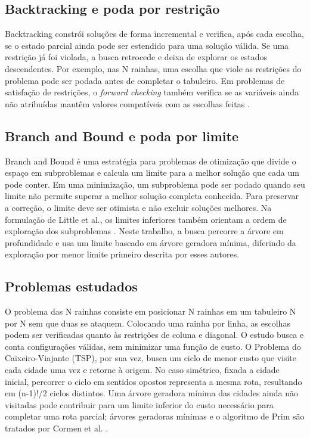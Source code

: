 \documentclass[12pt]{article}
\begin{document}
\subsection{Backtracking e poda por restrição}

Backtracking constrói soluções de forma incremental e verifica, após cada escolha, se o estado parcial ainda pode ser estendido para uma solução válida. Se uma restrição já foi violada, a busca retrocede e deixa de explorar os estados descendentes. Por exemplo, nas N rainhas, uma escolha que viole as restrições do problema pode ser podada antes de completar o tabuleiro. Em problemas de satisfação de restrições, o \emph{forward checking} também verifica se as variáveis ainda não atribuídas mantêm valores compatíveis com as escolhas feitas \cite{haralick:1980}.

\subsection{Branch and Bound e poda por limite}

Branch and Bound é uma estratégia para problemas de otimização que divide o espaço em subproblemas e calcula um limite para a melhor solução que cada um pode conter. Em uma minimização, um subproblema pode ser podado quando seu limite não permite superar a melhor solução completa conhecida. Para preservar a correção, o limite deve ser otimista e não excluir soluções melhores. Na formulação de Little et al., os limites inferiores também orientam a ordem de exploração dos subproblemas \cite{little:1963}. Neste trabalho, a busca percorre a árvore em profundidade e usa um limite baseado em árvore geradora mínima, diferindo da exploração por menor limite primeiro descrita por esses autores.

\subsection{Problemas estudados}

O problema das N rainhas consiste em posicionar N rainhas em um tabuleiro N por N sem que duas se ataquem. Colocando uma rainha por linha, as escolhas podem ser verificadas quanto às restrições de coluna e diagonal. O estudo busca e conta configurações válidas, sem minimizar uma função de custo. O Problema do Caixeiro-Viajante (TSP), por sua vez, busca um ciclo de menor custo que visite cada cidade uma vez e retorne à origem. No caso simétrico, fixada a cidade inicial, percorrer o ciclo em sentidos opostos representa a mesma rota, resultando em (n-1)!/2 ciclos distintos. Uma árvore geradora mínima das cidades ainda não visitadas pode contribuir para um limite inferior do custo necessário para completar uma rota parcial; árvores geradoras mínimas e o algoritmo de Prim são tratados por Cormen et al. \cite{cormen:2012}.
\end{document}
